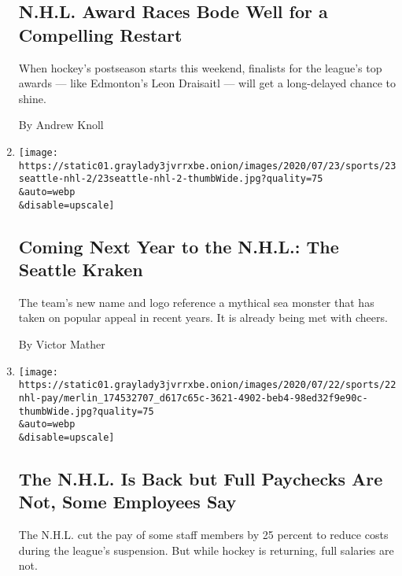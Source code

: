 \begin{enumerate}
  \hypertarget{nhl-award-races-bode-well-for-a-compelling-restart}{%
  \subsection{N.H.L. Award Races Bode Well for a Compelling
  Restart}\label{nhl-award-races-bode-well-for-a-compelling-restart}}

  When hockey's postseason starts this weekend, finalists for the
  league's top awards --- like Edmonton's Leon Draisaitl --- will get a
  long-delayed chance to shine.

  By Andrew Knoll
\item
  \href{/2020/07/23/sports/hockey/seattle-kraken-nhl-team-name.html}{}

  \texttt{[image: https://static01.graylady3jvrrxbe.onion/images/2020/07/23/sports/23seattle-nhl-2/23seattle-nhl-2-thumbWide.jpg?quality=75\\\&auto=webp\\\&disable=upscale]}

  \hypertarget{coming-next-year-to-the-nhl-the-seattle-kraken}{%
  \subsection{Coming Next Year to the N.H.L.: The Seattle
  Kraken}\label{coming-next-year-to-the-nhl-the-seattle-kraken}}

  The team's new name and logo reference a mythical sea monster that has
  taken on popular appeal in recent years. It is already being met with
  cheers.

  By Victor Mather
\item
  \href{/2020/07/22/sports/hockey/nhl-pay-cut-employees-restart.html}{}

  \texttt{[image: https://static01.graylady3jvrrxbe.onion/images/2020/07/22/sports/22nhl-pay/merlin\_174532707\_d617c65c-3621-4902-beb4-98ed32f9e90c-thumbWide.jpg?quality=75\\\&auto=webp\\\&disable=upscale]}

  \hypertarget{the-nhl-is-back-but-full-paychecks-are-not-some-employees-say}{%
  \subsection{The N.H.L. Is Back but Full Paychecks Are Not, Some
  Employees
  Say}\label{the-nhl-is-back-but-full-paychecks-are-not-some-employees-say}}

  The N.H.L. cut the pay of some staff members by 25 percent to reduce
  costs during the league's suspension. But while hockey is returning,
  full salaries are not.


\end{enumerate}
